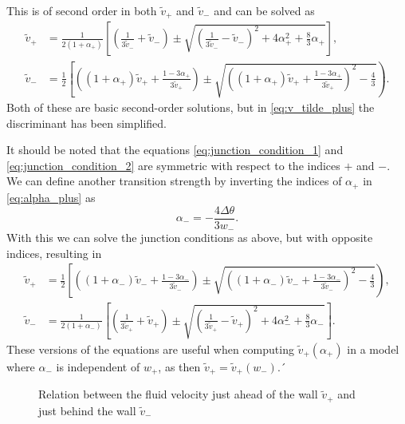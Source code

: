 This is of second order in both $\tilde{v}_+$ and $\tilde{v}_-$ and can be solved as \cite[eq. B.6, B.7]{hindmarsh_gw_pt_2019}
\begin{align}
\tilde{v}_+ &= \frac{1}{2(1+\alpha_+)}\left[ \left(\frac{1}{3\tilde{v}_-}+\tilde{v}_-\right) \pm \sqrt{\left(\frac{1}{3\tilde{v}_-} - \tilde{v}_- \right)^2 + 4\alpha_+^2 + \frac{8}{3} \alpha_+} \right],
\label{eq:v_tilde_plus}
\\
\tilde{v}_- &= \frac{1}{2} \left[ \left( (1+\alpha_+)\tilde{v}_+ + \frac{1-3\alpha_+}{3\tilde{v}_+} \right) \pm \sqrt{\left((1+\alpha_+)\tilde{v}_+ + \frac{1-3\alpha_+}{3\tilde{v}_+} \right)^2 - \frac{4}{3}} \right).
\label{eq:v_tilde_minus}
\end{align}
Both of these are basic second-order solutions, but in \eqref{eq:v_tilde_plus} the discriminant has been simplified.

It should be noted that the equations \ref{eq:junction_condition_1} and \ref{eq:junction_condition_2} are symmetric with respect to the indices $+$ and $-$.
We can define another transition strength by inverting the indices of $\alpha_+$ in \ref{eq:alpha_plus} as
\begin{equation}
\alpha_- = - \frac{4 \Delta \theta}{3 w_-}.
\end{equation}
With this we can solve the junction conditions as above, but with opposite indices, resulting in
\begin{align}
\tilde{v}_+ &= \frac{1}{2} \left[ \left( (1+\alpha_-)\tilde{v}_- + \frac{1-3\alpha_-}{3\tilde{v}_-} \right) \pm \sqrt{\left((1+\alpha_-)\tilde{v}_- + \frac{1-3\alpha_-}{3\tilde{v}_-} \right)^2 - \frac{4}{3}} \right),
\label{eq:v_tilde_plus_reverse}
\\
\tilde{v}_- &= \frac{1}{2(1+\alpha_-)}\left[ \left(\frac{1}{3\tilde{v}_+}+\tilde{v}_+\right) \pm \sqrt{\left(\frac{1}{3\tilde{v}_+} - \tilde{v}_+ \right)^2 + 4\alpha_-^2 + \frac{8}{3} \alpha_-} \right].
\label{eq:v_tilde_minus_reverse}
\end{align}
These versions of the equations are useful when computing $\tilde{v}_+(\alpha_+)$ in a model where $\alpha_-$ is independent of $w_+$, as then $\tilde{v}_+ = \tilde{v}_+(w_-)$.´

\begin{figure}[h!]
\centering
{}
\caption{Relation between the fluid velocity just ahead of the wall $\tilde{v}_+$ and just behind the wall $\tilde{v}_-$ \cite[fig. 13]{lecture_notes}}
\label{fig:vplus_vminus}
\end{figure}

